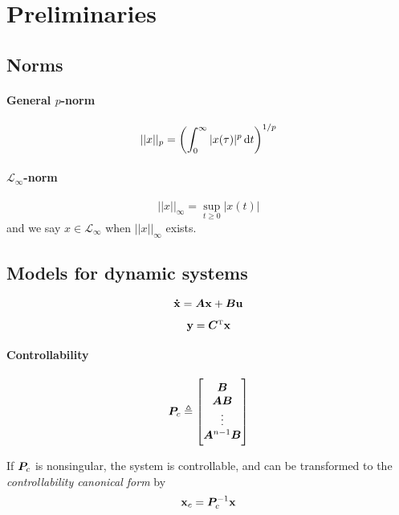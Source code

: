 \section{Preliminaries}
\subsection{Norms}
\paragraph{General $p$-norm}
\begin{equation}
	||x||_p
	=
	\left(
		\int_{0}^{\infty} |x(\tau)|^p \dif t
	\right)
	^{1/p}
\end{equation}

\paragraph{$\mathcal{L}_\infty$-norm}
\begin{equation}
	||x||_\infty
	=
	\sup_{t \geq 0} |x(t)|
\end{equation}
and we say $x \in \mathcal{L}_\infty$ when $||x||_\infty$ exists.

\subsection{Models for dynamic systems}

\begin{equation}
	\boldsymbol{\mathbf{\dot{x}}}
	=
	\bm{A} \boldsymbol{\mathbf{x}}
	+
	\bm{B} \boldsymbol{\mathbf{u}}
\end{equation}

\begin{equation}
	\boldsymbol{\mathbf{y}}
	=
	\bm{C}^{\scriptscriptstyle \mathrm{T}} \boldsymbol{\mathbf{x}}
\end{equation}

\paragraph{Controllability}
\begin{equation}
	\bm{P}_c
	\triangleq
	\begin{bmatrix}
		\bm{B} \\ \bm{AB} \\ \vdots \\ \bm{A}^{n-1}\bm{B}
	\end{bmatrix}
\end{equation}

If $\bm{P}_c$ is nonsingular, the system is controllable, and can be transformed to the \emph{controllability canonical form} by
\begin{equation}
	\boldsymbol{\mathbf{x}}_c
	=
	\bm{P}_c^{-1} \boldsymbol{\mathbf{x}}
\end{equation}

